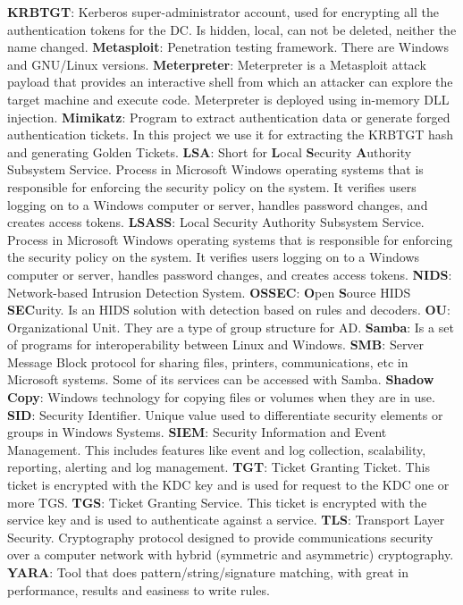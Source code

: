 \linej
\linej
\textbf{KRBTGT}: Kerberos super-administrator account, used for encrypting all the authentication tokens for the DC. Is hidden, local, can not be deleted, neither the name changed.
\linej
\linej
\textbf{Metasploit}: Penetration testing framework. There are Windows and GNU/Linux versions.
\linej
\linej
\textbf{Meterpreter}: Meterpreter is a Metasploit attack payload that provides an interactive shell from which an attacker can explore the target machine and execute code. Meterpreter is deployed using in-memory DLL injection.
\linej
\linej
\textbf{Mimikatz}: Program to extract authentication data or generate forged authentication tickets. In this project we use it for extracting the KRBTGT hash and generating Golden Tickets.
\linej
\linej
\textbf{LSA}: Short for \textbf{L}ocal \textbf{S}ecurity \textbf{A}uthority Subsystem Service. Process in Microsoft Windows operating systems that is responsible for enforcing the security policy on the system. It verifies users logging on to a Windows computer or server, handles password changes, and creates access tokens.
\linej
\linej
\textbf{LSASS}: Local Security Authority Subsystem Service. Process in Microsoft Windows operating systems that is responsible for enforcing the security policy on the system. It verifies users logging on to a Windows computer or server, handles password changes, and creates access tokens.
\linej
\linej
\textbf{NIDS}: Network-based Intrusion Detection System.
\linej
\linej
\textbf{OSSEC}: \textbf{O}pen \textbf{S}ource HIDS \textbf{SEC}urity. Is an HIDS solution with detection based on rules and decoders.
\linej
\linej
\textbf{OU}: Organizational Unit. They are a type of group structure for AD.
\linej
\linej
\textbf{Samba}: Is a set of programs for interoperability between Linux and Windows.
\linej
\linej
\textbf{SMB}: Server Message Block protocol for sharing files, printers, communications, etc in Microsoft systems. Some of its services can be accessed with Samba.
\linej
\linej
\textbf{Shadow Copy}: Windows technology for copying files or volumes when they are in use.
\linej
\linej
\textbf{SID}: Security Identifier. Unique value used to differentiate security elements or groups in Windows Systems.
\linej
\linej
\textbf{SIEM}: Security Information and Event Management. This includes features like event and log collection, scalability, reporting, alerting and log management.
\linej
\linej
\textbf{TGT}: Ticket Granting Ticket. This ticket is encrypted with the KDC key and is used for request to the KDC one or more TGS.
\linej
\linej
\textbf{TGS}: Ticket Granting Service. This ticket is encrypted with the service key and is used to authenticate against a service.
\linej
\linej
\textbf{TLS}: Transport Layer Security. Cryptography protocol designed to provide communications security over a computer network with hybrid (symmetric and asymmetric) cryptography.
\linej
\linej
\textbf{YARA}: Tool that does pattern/string/signature matching, with great in performance, results and easiness to write rules.
\linej
\linej
